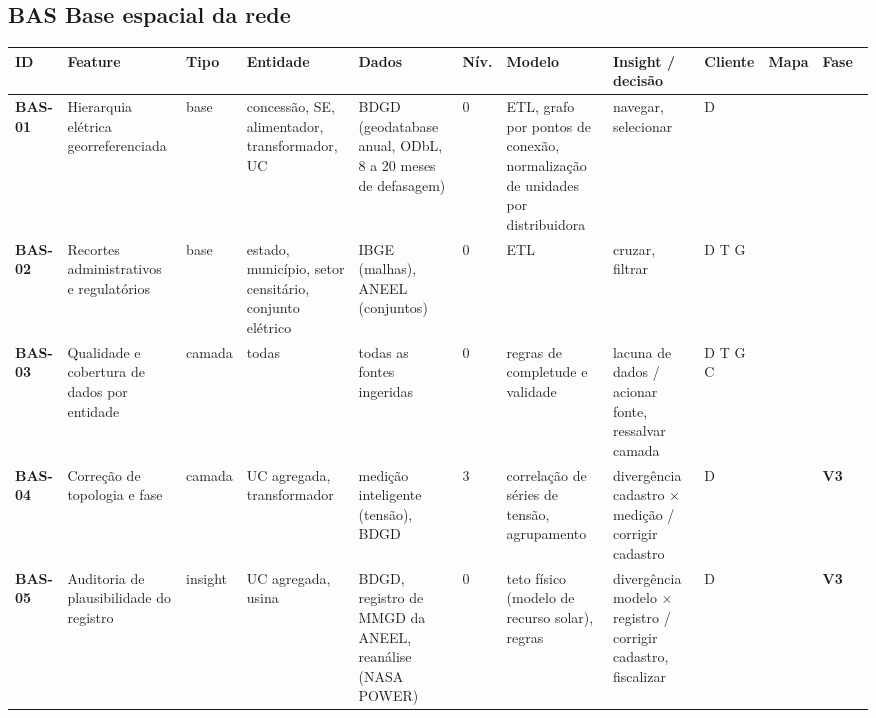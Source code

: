 \subsection*{BAS \textperiodcentered{} Base espacial da rede}
\label{cat:BAS}
{\footnotesize\setlength{\tabcolsep}{3pt}
\begin{longtable}{@{}P{1.35cm}P{4.1cm}P{1.3cm}P{3.1cm}P{3.7cm}C{0.6cm}P{3.6cm}P{3.3cm}P{1.1cm}P{0.9cm}P{1.1cm}@{}}
\toprule
\textbf{ID} & \textbf{Feature} & \textbf{Tipo} & \textbf{Entidade} & \textbf{Dados} & \textbf{Nív.} & \textbf{Modelo} & \textbf{Insight / decisão} & \textbf{Cliente} & \textbf{Mapa} & \textbf{Fase} \\
\midrule\endhead
\textbf{BAS-01} & Hierarquia elétrica georreferenciada & base & concessão, SE, alimentador, transformador, UC & BDGD (geodatabase anual, ODbL, 8 a 20 meses de defasagem) & 0 & ETL, grafo por pontos de conexão, normalização de unidades por distribuidora & navegar, selecionar & D &  & \colorbox{fMVP}{\scriptsize \textcolor{white}{\textbf{MVP}}} \\
\textbf{BAS-02} & Recortes administrativos e regulatórios & base & estado, município, setor censitário, conjunto elétrico & IBGE (malhas), ANEEL (conjuntos) & 0 & ETL & cruzar, filtrar & D T G &  & \colorbox{fMVP}{\scriptsize \textcolor{white}{\textbf{MVP}}} \\
\textbf{BAS-03} & Qualidade e cobertura de dados por entidade & camada & todas & todas as fontes ingeridas & 0 & regras de completude e validade & lacuna de dados / acionar fonte, ressalvar camada & D T G C &  & \colorbox{fMVP}{\scriptsize \textcolor{white}{\textbf{MVP}}} \\
\textbf{BAS-04} & Correção de topologia e fase & camada & UC agregada, transformador & medição inteligente (tensão), BDGD & 3 & correlação de séries de tensão, agrupamento & divergência cadastro $\times$ medição / corrigir cadastro & D &  & \colorbox{fV3}{\scriptsize \textbf{V3}} \\
\textbf{BAS-05} & Auditoria de plausibilidade do registro & insight & UC agregada, usina & BDGD, registro de MMGD da ANEEL, reanálise (NASA POWER) & 0 & teto físico (modelo de recurso solar), regras & divergência modelo $\times$ registro / corrigir cadastro, fiscalizar & D &  & \colorbox{fV3}{\scriptsize \textbf{V3}} \\
\bottomrule
\end{longtable}}

